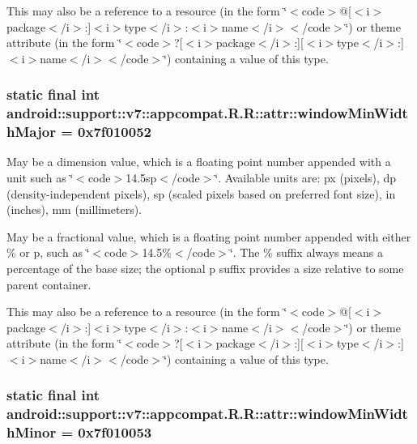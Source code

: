 This may also be a reference to a resource (in the form \char`\"{}$<$code$>$@\mbox{[}$<$i$>$package$<$/i$>$:\mbox{]}$<$i$>$type$<$/i$>$:$<$i$>$name$<$/i$>$$<$/code$>$\char`\"{}) or theme attribute (in the form \char`\"{}$<$code$>$?\mbox{[}$<$i$>$package$<$/i$>$:\mbox{]}\mbox{[}$<$i$>$type$<$/i$>$:\mbox{]}$<$i$>$name$<$/i$>$$<$/code$>$\char`\"{}) containing a value of this type. \hypertarget{classandroid_1_1support_1_1v7_1_1appcompat_1_1_r_1_1attr_807276ccffe6f2e6a24c4ed476325aba}{
\subsubsection[{windowMinWidthMajor}]{\setlength{\rightskip}{0pt plus 5cm}static final int android::support::v7::appcompat.R.R::attr::windowMinWidthMajor = 0x7f010052}}
\label{classandroid_1_1support_1_1v7_1_1appcompat_1_1_r_1_1attr_807276ccffe6f2e6a24c4ed476325aba}


May be a dimension value, which is a floating point number appended with a unit such as \char`\"{}$<$code$>$14.5sp$<$/code$>$\char`\"{}. Available units are: px (pixels), dp (density-independent pixels), sp (scaled pixels based on preferred font size), in (inches), mm (millimeters). 

May be a fractional value, which is a floating point number appended with either \% or p, such as \char`\"{}$<$code$>$14.5\%$<$/code$>$\char`\"{}. The \% suffix always means a percentage of the base size; the optional p suffix provides a size relative to some parent container. 

This may also be a reference to a resource (in the form \char`\"{}$<$code$>$@\mbox{[}$<$i$>$package$<$/i$>$:\mbox{]}$<$i$>$type$<$/i$>$:$<$i$>$name$<$/i$>$$<$/code$>$\char`\"{}) or theme attribute (in the form \char`\"{}$<$code$>$?\mbox{[}$<$i$>$package$<$/i$>$:\mbox{]}\mbox{[}$<$i$>$type$<$/i$>$:\mbox{]}$<$i$>$name$<$/i$>$$<$/code$>$\char`\"{}) containing a value of this type. \hypertarget{classandroid_1_1support_1_1v7_1_1appcompat_1_1_r_1_1attr_33cce245f8ff93ab2e9c7d42a9d2b3a6}{
\subsubsection[{windowMinWidthMinor}]{\setlength{\rightskip}{0pt plus 5cm}static final int android::support::v7::appcompat.R.R::attr::windowMinWidthMinor = 0x7f010053}}
\label{classandroid_1_1support_1_1v7_1_1appcompat_1_1_r_1_1attr_33cce245f8ff93ab2e9c7d42a9d2b3a6}


